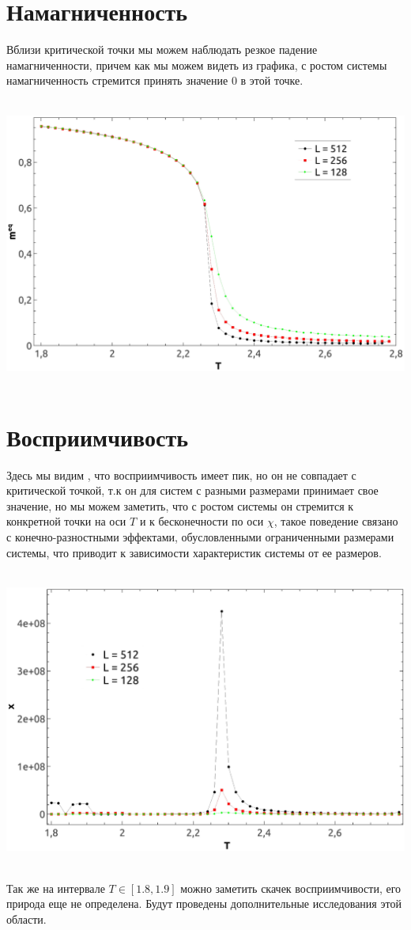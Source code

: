 \documentclass[12pt,a4paper]{article}
\begin{document}
	\section{Намагниченность}
	Вблизи критической точки мы можем наблюдать резкое падение намагниченности, причем как мы можем видеть из графика, с ростом системы намагниченность стремится принять значение 0 в этой точке.
	\begin{center}
	\mbox{
		\includegraphics[scale=0.4]{meq}
	} 
	\end{center}
	\section{Восприимчивость}
	Здесь мы видим , что восприимчивость имеет пик, но он не совпадает с критической точкой, т.к он для систем с разными размерами принимает свое значение, но мы можем заметить, что с ростом системы он стремится к конкретной точки на оси $T$ и к бесконечности по оси $\chi$, такое поведение связано с конечно-разностными эффектами, обусловленными ограниченными размерами системы, что приводит к зависимости характеристик системы от ее размеров.
	\begin{center}
	\mbox{
		\includegraphics[scale=0.4]{chi}
	}
	\end{center} 
Так же на интервале $T \in[1.8, 1.9]$ можно заметить скачек восприимчивости, его природа еще не определена. Будут проведены дополнительные исследования этой области.
\end{document}

